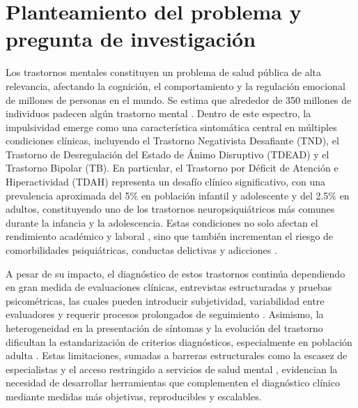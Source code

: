 


\section{Planteamiento del problema y pregunta de investigación}

Los trastornos mentales constituyen un problema de salud pública de alta relevancia, afectando la cognición, el comportamiento y la regulación emocional de millones de personas en el mundo. Se estima que alrededor de 350 millones de individuos padecen algún trastorno mental \cite{Dehghan-Bonari2023}. Dentro de este espectro, la impulsividad emerge como una característica sintomática central en múltiples condiciones clínicas, incluyendo el Trastorno Negativista Desafiante (TND), el Trastorno de Desregulación del Estado de Ánimo Disruptivo (TDEAD) y el Trastorno Bipolar (TB). En particular, el Trastorno por Déficit de Atención e Hiperactividad (TDAH) representa un desafío clínico significativo, con una prevalencia aproximada del 5\% en población infantil y adolescente y del 2.5\% en adultos, constituyendo uno de los trastornos neuropsiquiátricos más comunes durante la infancia y la adolescencia. Estas condiciones no solo afectan el rendimiento académico y laboral \cite{Ayano2020}, sino que también incrementan el riesgo de comorbilidades psiquiátricas, conductas delictivas y adicciones \cite{Faraone2015}.

A pesar de su impacto, el diagnóstico de estos trastornos continúa dependiendo en gran medida de evaluaciones clínicas, entrevistas estructuradas y pruebas psicométricas, las cuales pueden introducir subjetividad, variabilidad entre evaluadores y requerir procesos prolongados de seguimiento \cite{Zhou2015-bg,LOHANI2023111689}. Asimismo, la heterogeneidad en la presentación de síntomas y la evolución del trastorno dificultan la estandarización de criterios diagnósticos, especialmente en población adulta \cite{adam2013mental,Sibley21042021}. Estas limitaciones, sumadas a barreras estructurales como la escasez de especialistas y el acceso restringido a servicios de salud mental \cite{Asherson2022,Pallanti2020}, evidencian la necesidad de desarrollar herramientas que complementen el diagnóstico clínico mediante medidas más objetivas, reproducibles y escalables.

